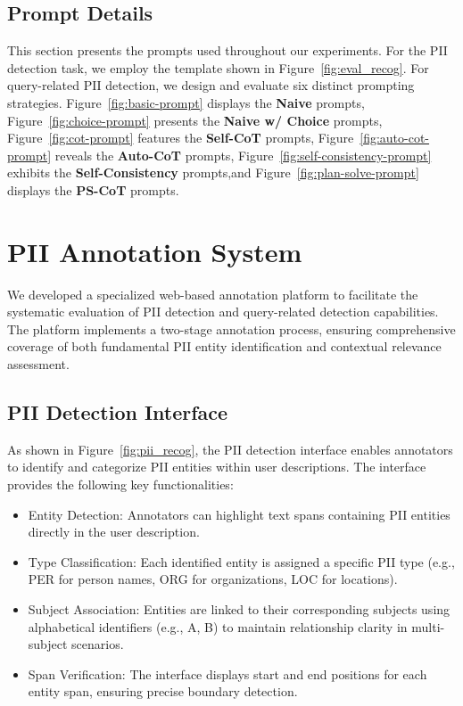 \subsection{Prompt Details}
\label{sec:prompt}
This section presents the prompts used throughout our experiments. For the PII detection task, we employ the template shown in Figure~\ref{fig:eval_recog}. For query-related PII detection, we design and evaluate six distinct prompting strategies. Figure~\ref{fig:basic-prompt} displays the \textbf{Naive} prompts, Figure~\ref{fig:choice-prompt} presents the \textbf{Naive w/ Choice} prompts, Figure~\ref{fig:cot-prompt} features the \textbf{Self-CoT} prompts, Figure~\ref{fig:auto-cot-prompt} reveals the \textbf{Auto-CoT} prompts, Figure~\ref{fig:self-consistency-prompt} exhibits the \textbf{Self-Consistency} prompts,and Figure~\ref{fig:plan-solve-prompt} displays the \textbf{PS-CoT} prompts.


\section{PII Annotation System}
\label{sec:annotation}
We developed a specialized web-based annotation platform to facilitate the systematic evaluation of PII detection and query-related detection capabilities. The platform implements a two-stage annotation process, ensuring comprehensive coverage of both fundamental PII entity identification and contextual relevance assessment.
\subsection{PII Detection Interface}
As shown in Figure~\ref{fig:pii_recog}, the PII detection interface enables annotators to identify and categorize PII entities within user descriptions. The interface provides the following key functionalities:
\begin{itemize}
\item Entity Detection: Annotators can highlight text spans containing PII entities directly in the user description.
\item Type Classification: Each identified entity is assigned a specific PII type (e.g., PER for person names, ORG for organizations, LOC for locations).
\item Subject Association: Entities are linked to their corresponding subjects using alphabetical identifiers (e.g., A, B) to maintain relationship clarity in multi-subject scenarios.
\item Span Verification: The interface displays start and end positions for each entity span, ensuring precise boundary detection.
\end{itemize}
